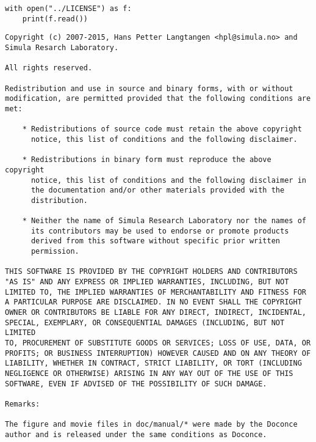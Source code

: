 \documentclass[%
oneside,                 %
final,                   %
chapterprefix=true,      %
open=right,              %
10pt]{book}
\begin{document}
\begin{Verbatim}[numbers=none,fontsize=\fontsize{9pt}{9pt},baselinestretch=0.95]
with open("../LICENSE") as f:
    print(f.read())
\end{Verbatim}
\begin{Verbatim}[numbers=none,fontsize=\fontsize{9pt}{9pt},baselinestretch=0.95]
Copyright (c) 2007-2015, Hans Petter Langtangen <hpl@simula.no> and
Simula Resarch Laboratory.

All rights reserved.

Redistribution and use in source and binary forms, with or without
modification, are permitted provided that the following conditions are
met:

    * Redistributions of source code must retain the above copyright
      notice, this list of conditions and the following disclaimer.

    * Redistributions in binary form must reproduce the above copyright
      notice, this list of conditions and the following disclaimer in
      the documentation and/or other materials provided with the
      distribution.

    * Neither the name of Simula Research Laboratory nor the names of
      its contributors may be used to endorse or promote products
      derived from this software without specific prior written
      permission.

THIS SOFTWARE IS PROVIDED BY THE COPYRIGHT HOLDERS AND CONTRIBUTORS
"AS IS" AND ANY EXPRESS OR IMPLIED WARRANTIES, INCLUDING, BUT NOT
LIMITED TO, THE IMPLIED WARRANTIES OF MERCHANTABILITY AND FITNESS FOR
A PARTICULAR PURPOSE ARE DISCLAIMED. IN NO EVENT SHALL THE COPYRIGHT
OWNER OR CONTRIBUTORS BE LIABLE FOR ANY DIRECT, INDIRECT, INCIDENTAL,
SPECIAL, EXEMPLARY, OR CONSEQUENTIAL DAMAGES (INCLUDING, BUT NOT LIMITED
TO, PROCUREMENT OF SUBSTITUTE GOODS OR SERVICES; LOSS OF USE, DATA, OR
PROFITS; OR BUSINESS INTERRUPTION) HOWEVER CAUSED AND ON ANY THEORY OF
LIABILITY, WHETHER IN CONTRACT, STRICT LIABILITY, OR TORT (INCLUDING
NEGLIGENCE OR OTHERWISE) ARISING IN ANY WAY OUT OF THE USE OF THIS
SOFTWARE, EVEN IF ADVISED OF THE POSSIBILITY OF SUCH DAMAGE.

Remarks:

The figure and movie files in doc/manual/* were made by the Doconce
author and is released under the same conditions as Doconce.


\end{Verbatim}

\end{document}
